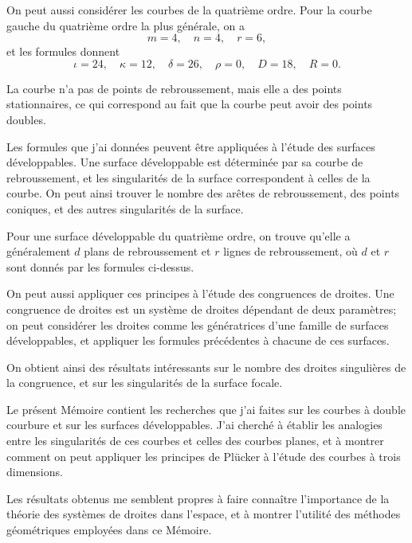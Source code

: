 \documentclass[11pt,a4paper]{article}
\begin{document}
\newpage
\setcounter{page}{213}

On peut aussi consid\'{e}rer les courbes de la quatri\`{e}me ordre. Pour la courbe gauche
du quatri\`{e}me ordre la plus g\'{e}n\'{e}rale, on a
\[
m = 4, \quad n = 4, \quad r = 6,
\]
et les formules donnent
\[
\iota = 24, \quad \kappa = 12, \quad \delta = 26, \quad \rho = 0, \quad D = 18, \quad R = 0.
\]

La courbe n'a pas de points de rebroussement, mais elle a des points stationnaires,
ce qui correspond au fait que la courbe peut avoir des points doubles.

\newpage
\setcounter{page}{214}

Les formules que j'ai donn\'{e}es peuvent \^{e}tre appliqu\'{e}es \`{a} l'\'{e}tude des surfaces d\'{e}veloppables.
Une surface d\'{e}veloppable est d\'{e}termin\'{e}e par sa courbe de rebroussement, et les singularit\'{e}s
de la surface correspondent \`{a} celles de la courbe. On peut ainsi trouver le nombre des
ar\^{e}tes de rebroussement, des points coniques, et des autres singularit\'{e}s de la surface.

Pour une surface d\'{e}veloppable du quatri\`{e}me ordre, on trouve qu'elle a g\'{e}n\'{e}ralement
$d$ plans de rebroussement et $r$ lignes de rebroussement, o\`{u} $d$ et $r$ sont donn\'{e}s par les
formules ci-dessus.

\newpage
\setcounter{page}{215}

On peut aussi appliquer ces principes \`{a} l'\'{e}tude des congruences de droites. Une
congruence de droites est un syst\`{e}me de droites d\'{e}pendant de deux param\`{e}tres; on peut
consid\'{e}rer les droites comme les g\'{e}n\'{e}ratrices d'une famille de surfaces d\'{e}veloppables, et
appliquer les formules pr\'{e}c\'{e}dentes \`{a} chacune de ces surfaces.

On obtient ainsi des r\'{e}sultats int\'{e}ressants sur le nombre des droites singuli\`{e}res de la
congruence, et sur les singularit\'{e}s de la surface focale.

\newpage
\setcounter{page}{216}

Le pr\'{e}sent M\'{e}moire contient les recherches que j'ai faites sur les courbes \`{a} double
courbure et sur les surfaces d\'{e}veloppables. J'ai cherch\'{e} \`{a} \'{e}tablir les analogies entre les
singularit\'{e}s de ces courbes et celles des courbes planes, et \`{a} montrer comment on peut
appliquer les principes de Pl\"{u}cker \`{a} l'\'{e}tude des courbes \`{a} trois dimensions.

Les r\'{e}sultats obtenus me semblent propres \`{a} faire conna\^{i}tre l'importance de la th\'{e}orie
des syst\`{e}mes de droites dans l'espace, et \`{a} montrer l'utilit\'{e} des m\'{e}thodes g\'{e}om\'{e}triques
employ\'{e}es dans ce M\'{e}moire.
\end{document}

